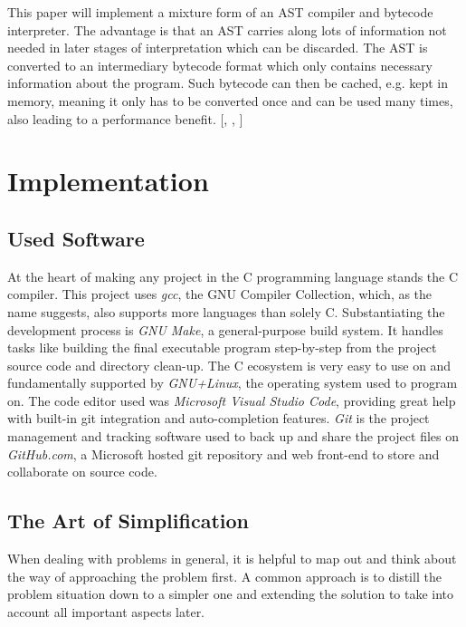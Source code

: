 \documentclass[12pt,a4paper]{article}
\begin{document}
This paper will implement a mixture form of an AST compiler and bytecode
interpreter. The advantage is that an AST carries along lots of information
not needed in later stages of interpretation which can be discarded. The AST
is converted to an intermediary bytecode format which only contains
necessary information about the program. Such bytecode can then be cached,
e.g. kept in memory, meaning it only has to be converted once and can be
used many times, also leading to a performance benefit.
[, , ]

\section{Implementation}
\subsection{Used Software}
At the heart of making any project in the C programming language
stands the C compiler. This project uses
\emph{gcc}, the GNU Compiler Collection, which, as the name suggests, also 
supports more languages than solely C. Substantiating the development process is 
\emph{GNU Make}, a general-purpose build system. It handles tasks like building
the final executable program step-by-step from the project source code and directory clean-up.
The C ecosystem is very easy to use on and fundamentally supported by 
\emph{GNU+Linux}, the operating system used to program on.
The code editor used was \emph{Microsoft Visual Studio Code}, providing great
help with built-in git integration and auto-completion features.
\emph{Git} is the project management and tracking software used to back up and share
the project files on \emph{GitHub.com}, a Microsoft hosted git repository and
web front-end to store and collaborate on source code.

\subsection{The Art of Simplification}
When dealing with problems in general, it is helpful to map out and think about
the way of approaching the problem first. A common approach is to distill the
problem situation down to a simpler one and extending the solution to take into
account all important aspects later.
\end{document}
